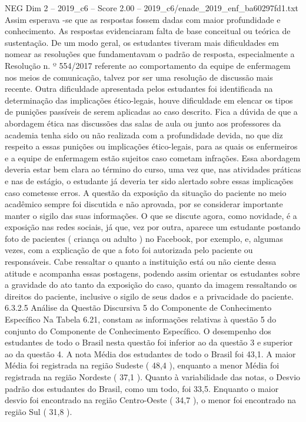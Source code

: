\begin{textsample}{NEG Dim 2 – 2019\_c6 – Score 2.00 – 2019\_c6/enade\_2019\_enf\_ba60297fd1.txt}
Assim esperava -se que as respostas fossem dadas com maior profundidade e conhecimento.
As respostas evidenciaram falta de base conceitual ou teórica de sustentação.
De um modo geral, os estudantes tiveram mais dificuldades em nomear as resoluções que fundamentavam o padrão de resposta, especialmente a Resolução n. º 554/2017 referente ao comportamento da equipe de enfermagem nos meios de comunicação, talvez por ser uma resolução de discussão mais recente.
Outra dificuldade apresentada pelos estudantes foi identificada na determinação das implicações ético-legais, houve dificuldade em elencar os tipos de punições passíveis de serem aplicadas ao caso descrito.
Fica a dúvida de que a abordagem ética nas discussões das salas de aula ou junto aos professores da academia tenha sido ou não realizada com a profundidade devida, no que diz respeito a essas punições ou implicações ético-legais, para as quais os enfermeiros e a equipe de enfermagem estão sujeitos caso cometam infrações.
Essa abordagem deveria estar bem clara ao término do curso, uma vez que, nas atividades práticas e nas de estágio, o estudante já deveria ter sido alertado sobre essas implicações caso cometesse erros.
A questão da exposição da situação do paciente no meio acadêmico sempre foi discutida e não aprovada, por se considerar importante manter o sigilo das suas informações.
O que se discute agora, como novidade, é a exposição nas redes sociais, já que, vez por outra, aparece um estudante postando foto de pacientes ( criança ou adulto ) no Facebook, por exemplo, e, algumas vezes, com a explicação de que a foto foi autorizada pelo paciente ou responsáveis.
Cabe ressaltar o quanto a instituição está ou não ciente dessa atitude e acompanha essas postagens, podendo assim orientar os estudantes sobre a gravidade do ato tanto da exposição do caso, quanto da imagem ressaltando os direitos do paciente, inclusive o sigilo de seus dados e a privacidade do paciente. 6.3.2.5 Análise da Questão Discursiva 5 do Componente de Conhecimento Específico Na Tabela 6.21, constam as informações relativas à questão 5 do conjunto do Componente de Conhecimento Específico.
O desempenho dos estudantes de todo o Brasil nesta questão foi inferior ao da questão 3 e superior ao da questão 4.
A nota Média dos estudantes de todo o Brasil foi 43,1.
A maior Média foi registrada na região Sudeste ( 48,4 ), enquanto a menor Média foi registrada na região Nordeste ( 37,1 ).
Quanto à variabilidade das notas, o Desvio padrão dos estudantes do Brasil, como um todo, foi 33,5.
Enquanto o maior desvio foi encontrado na região Centro-Oeste ( 34,7 ), o menor foi encontrado na região Sul ( 31,8 ).

\end{textsample}
